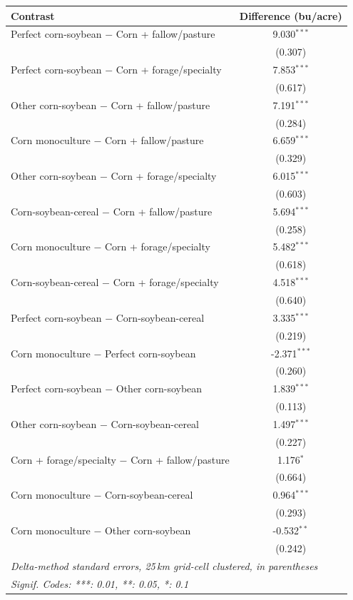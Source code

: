 
\begingroup
\centering
\begin{tabular}{lc}
   \tabularnewline \midrule \midrule
   Contrast & Difference (bu/acre)\\
   \midrule
   Perfect corn-soybean $-$ Corn + fallow/pasture & 9.030$^{***}$\\
   & (0.307)\\
   Perfect corn-soybean $-$ Corn + forage/specialty & 7.853$^{***}$\\
   & (0.617)\\
   Other corn-soybean $-$ Corn + fallow/pasture & 7.191$^{***}$\\
   & (0.284)\\
   Corn monoculture $-$ Corn + fallow/pasture & 6.659$^{***}$\\
   & (0.329)\\
   Other corn-soybean $-$ Corn + forage/specialty & 6.015$^{***}$\\
   & (0.603)\\
   Corn-soybean-cereal $-$ Corn + fallow/pasture & 5.694$^{***}$\\
   & (0.258)\\
   Corn monoculture $-$ Corn + forage/specialty & 5.482$^{***}$\\
   & (0.618)\\
   Corn-soybean-cereal $-$ Corn + forage/specialty & 4.518$^{***}$\\
   & (0.640)\\
   Perfect corn-soybean $-$ Corn-soybean-cereal & 3.335$^{***}$\\
   & (0.219)\\
   Corn monoculture $-$ Perfect corn-soybean & -2.371$^{***}$\\
   & (0.260)\\
   Perfect corn-soybean $-$ Other corn-soybean & 1.839$^{***}$\\
   & (0.113)\\
   Other corn-soybean $-$ Corn-soybean-cereal & 1.497$^{***}$\\
   & (0.227)\\
   Corn + forage/specialty $-$ Corn + fallow/pasture & 1.176$^{*}$\\
   & (0.664)\\
   Corn monoculture $-$ Corn-soybean-cereal & 0.964$^{***}$\\
   & (0.293)\\
   Corn monoculture $-$ Other corn-soybean & -0.532$^{**}$\\
   & (0.242)\\
   \midrule \midrule
   \multicolumn{2}{l}{\emph{Delta-method standard errors, 25\,km grid-cell clustered, in parentheses}}\\
   \multicolumn{2}{l}{\emph{Signif. Codes: ***: 0.01, **: 0.05, *: 0.1}}\\
\end{tabular}
\par\endgroup

